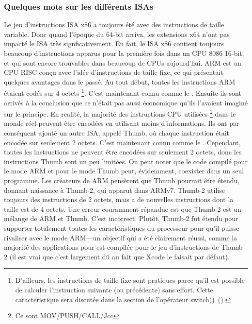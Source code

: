 %
%
%

\subsubsection{Quelques mots sur les différents \ac{ISA}s}
Le jeu d'instructions \ac{ISA} x86 a toujours été avec des instructions de taille variable. Donc quand l'époque du 64-bit arriva, les extensions x64 n'ont pas impacté le \ac{ISA} très signficativement. En fait, le \ac{ISA} x86 contient toujours beaucoup d'instructions apparus pour la première fois dans un CPU 8086 16-bit, et qui sont encore trouvables dans beaucoup de CPUs aujourd'hui.
ARM est un \ac{CPU} \ac{RISC} conçu avec l'idée d'instructions de taille fixe, ce qui présentait quelques avantages dans le passé.
Au tout début, toutes les instructions ARM étaient codés sur 4 octets%
\footnote{D'ailleurs, les instructions de taille fixe sont pratiques parce qu'il est possible de calculer l'instruction suivante (ou précédente) sans effort. Cette caracteristique sera discutée dans la section de l'opérateur switch()~().}.
C'est maintenant connu comme le .
Ensuite ils sont arrivés à la conclusion que ce n'était pas aussi économique qu'ils l'avaient imaginé sur le principe.
En realité, la majorité des instructions \ac{CPU} utilisées \footnote{Ce sont MOV/PUSH/CALL/Jcc} dans le monde réel peuvent être encodées en utilisant moins d'informations.
Ils ont par conséquent ajouté un autre \ac{ISA}, appelé Thumb, où chaque instruction était encodée sur seulement 2 octets.
C'est maintenant connu comme le .
Cependant, toutes les instructions ne peuvent être encodées sur seulement 2 octets, donc les instructions Thumb sont un peu limitées.
On peut noter que le code compilé pour le mode ARM et pour le mode Thumb peut, évidemment, coexister dans un seul programme.
Les créateurs de ARM pensèrent que Thumb pourrait être étendu, donnant naissance à Thumb-2, qui apparut dans ARMv7.
Thumb-2 utilise toujours des instructions de 2 octets, mais a de nouvelles instructions dont la taille est de 4 octets.
Une erreur couramment répandue est que Thumb-2 est un mélange de ARM et Thumb. C'est incorrect.
Plutôt, Thumb-2 fut étendu pour supporter totalement toutes les caractéristiques du processeur pour qu'il puisse
rivaliser avec le mode ARM---un objectif qui a été clairement réussi, comme la majorité des applications pour \idevices est compilée pour le jeu d'instructions de Thumb-2 (il est vrai que c'est largement dû au fait que Xcode le faisait par défaut).
